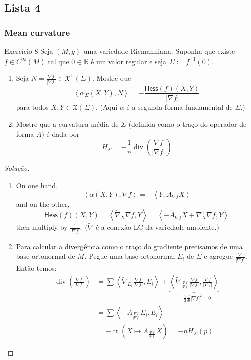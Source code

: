 \subsection{Lista 4}
\clearpage
\subsubsection{Mean curvature}

\begin{thing4}{Exercício 8}\label{exer:8}\leavevmode
Seja \((M,g)\) uma variedade Riemanniana. Suponha que existe \(f \in C^\infty(M)\) tal que \(0 \in \mathbb{R}\) é um valor regular e seja \(\Sigma:=f^{-1}(0)\).
\begin{enumerate}[label=(\alph*)]
\item Seja \(N=\frac{\nabla f}{|\nabla f|}\in \mathfrak{X}^\perp(\Sigma)\). Mostre que
	\[\left<\alpha_{\Sigma}(X,Y),N\right>=-\frac{\mathsf{Hess}(f)(X,Y)}{|\nabla f|}\]
para todos \(X,Y \in \mathfrak{X}(\Sigma)\). (Aqui \(\alpha\) é a segunda forma fundamental de \(\Sigma\).)
\item Mostre que a curvatura média de \(\Sigma\) (definida como o traço do operador de forma \(A\)) é dada por
	\[H_\Sigma=-\frac{1}{n}\operatorname{div}\left(\frac{\nabla f}{|\nabla f|}\right) \]
\end{enumerate}
\end{thing4}

\begin{proof}[Solução]\leavevmode
\begin{enumerate}[label=(\alph*)]
\item On one hand,
	\[\left<\alpha(X,Y),\nabla f\right>=-\left<Y,A_{\nabla f}X\right>\]
	and on the other, 
\[\mathsf{Hess}(f)(X,Y)=\left<\widetilde{\nabla}_X\nabla f,Y\right>=\left<-A_{\nabla f}X+\nabla^\perp_X \nabla f,Y\right>\]
then multiply by \(\frac{1}{|\nabla f|}\). (\(\tilde{\nabla}\) é a conexão LC da variedade ambiente.)
\item Para calcular a divergência como o traço do gradiente precisamos de uma base ortonormal de \(M\). Pegue uma base ortonormal \(E_i\) de \(\Sigma\) e agregue \(\frac{\nabla}{|\nabla f|}\). Então temos:
	\begin{align*}
	\operatorname{div}\left(\frac{\nabla f}{|\nabla f|}\right)&=\sum \left<\widetilde{\nabla}_{E_i}\frac{\nabla f}{| \nabla f|},E_i\right>+\underbrace{\left<\widetilde{\nabla}_{\frac{\nabla f}{|\nabla f|}}\frac{\nabla f}{| \nabla f|}, \frac{ \nabla f}{| \nabla f|}\right>}_{=\frac{1}{2}\frac{d}{dt}|\nabla f|^2=0 }\\
	&=\sum \left<- A_{\frac{\nabla f}{| \nabla f|}}E_i,E_i\right>\\
	&=-\operatorname{tr}(X \mapsto A_{\frac{\nabla f}{| \nabla f|}}X)=-nH_{\Sigma}(p)
	\end{align*}
\end{enumerate}
\end{proof}


